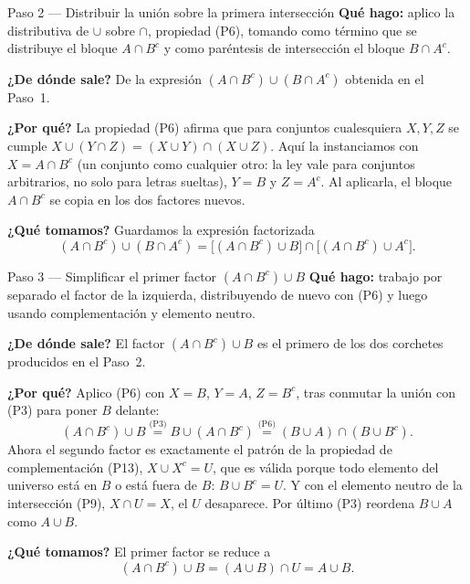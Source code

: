 \documentclass[11pt]{article}
\begin{document}
\begin{paso}{Paso 2 --- Distribuir la unión sobre la primera intersección}
\textbf{Qué hago:} aplico la distributiva de $\cup$ sobre $\cap$, propiedad (P6), tomando como
término que se distribuye el bloque $A\cap B^{c}$ y como paréntesis de intersección el bloque
$B\cap A^{c}$.

\textbf{¿De dónde sale?} De la expresión $(A\cap B^{c})\cup(B\cap A^{c})$ obtenida en el Paso~1.

\textbf{¿Por qué?} La propiedad (P6) afirma que para conjuntos cualesquiera $X,Y,Z$ se cumple
$X\cup(Y\cap Z)=(X\cup Y)\cap(X\cup Z)$. Aquí la instanciamos con $X=A\cap B^{c}$ (un conjunto
como cualquier otro: la ley vale para conjuntos arbitrarios, no solo para letras sueltas), $Y=B$
y $Z=A^{c}$. Al aplicarla, el bloque $A\cap B^{c}$ se copia en los dos factores nuevos.

\textbf{¿Qué tomamos?} Guardamos la expresión factorizada
\[
(A\cap B^{c})\cup(B\cap A^{c})=\bigl[(A\cap B^{c})\cup B\bigr]\cap\bigl[(A\cap B^{c})\cup A^{c}\bigr].
\]
\end{paso}

\begin{paso}{Paso 3 --- Simplificar el primer factor $(A\cap B^{c})\cup B$}
\textbf{Qué hago:} trabajo por separado el factor de la izquierda, distribuyendo de nuevo con
(P6) y luego usando complementación y elemento neutro.

\textbf{¿De dónde sale?} El factor $(A\cap B^{c})\cup B$ es el primero de los dos corchetes
producidos en el Paso~2.

\textbf{¿Por qué?} Aplico (P6) con $X=B$, $Y=A$, $Z=B^{c}$, tras conmutar la unión con (P3) para
poner $B$ delante:
\[
(A\cap B^{c})\cup B \overset{\text{(P3)}}{=} B\cup(A\cap B^{c})
\overset{\text{(P6)}}{=} (B\cup A)\cap(B\cup B^{c}).
\]
Ahora el segundo factor es exactamente el patrón de la propiedad de complementación (P13),
$X\cup X^{c}=U$, que es válida porque todo elemento del universo está en $B$ o está fuera de
$B$: $B\cup B^{c}=U$. Y con el elemento neutro de la intersección (P9), $X\cap U=X$, el $U$
desaparece. Por último (P3) reordena $B\cup A$ como $A\cup B$.

\textbf{¿Qué tomamos?} El primer factor se reduce a
\[
(A\cap B^{c})\cup B=(A\cup B)\cap U=A\cup B.
\]
\end{paso}
\end{document}
